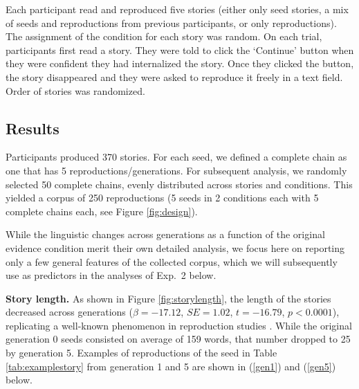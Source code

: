 \documentclass[10pt,letterpaper]{article}
\newcommand{\jd}[1]{\textcolor{Green}{[jd: #1]}}
\begin{document}
Each participant read and reproduced five stories (either only seed stories, a mix of seeds and reproductions from previous participants, or only reproductions). The assignment of the condition for each story was random. On each trial, participants first read a story. They were told to click the `Continue' button when they were confident they had internalized the story. Once they clicked the button, the story disappeared and they were asked to reproduce it freely in a text field. Order of stories was randomized.

\subsection{Results}

Participants produced 370 stories. For each seed, we defined a complete chain as one that has 5 reproductions/generations. For subsequent analysis, we randomly selected 50 complete chains, evenly distributed across stories and conditions. This yielded a corpus of 250 reproductions (5 seeds in 2 conditions each with 5 complete chains each, see Figure \ref{fig:design}).

While the linguistic changes across generations as a function of the original evidence condition merit their own detailed analysis, we focus here on reporting only a few general features of the collected corpus, which we will subsequently use as predictors in the analyses of Exp.~2 below.

\textbf{Story length.} As shown in Figure \ref{fig:storylength}, the length of the stories decreased across generations ($\beta = -17.12$, $SE = 1.02$, $t = -16.79$, $p < 0.0001$), replicating a well-known phenomenon in reproduction studies \cite{Bartlett:1932}. While the original generation 0 seeds consisted on average of 159 words, that number dropped to 25 by generation 5. Examples of reproductions of the seed in Table \ref{tab:examplestory} from generation 1 and 5 are shown in (\ref{gen1}) and (\ref{gen5}) below.


\end{document}
